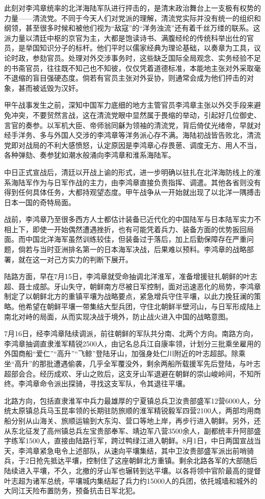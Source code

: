\documentclass[12pt,UTF8]{ctexbook}
\begin{document}
此刻对李鸿章统率的北洋海陆军队进行抨击的，是清末政治舞台上一支极有权势的力量——清流党。不同于今天人们对党派的理解，清流党实际并没有统一的组织和纲领，甚至很多时候和被他们视为“敌寇”的“洋务浊流”还有着千丝万缕的联系。这派力量以清廷中枢的京官为主，大都是饱读诗书、满腹经纶的传统科举出仕的官员，是举国知识分子的标杆。他们平时以儒家经典为理论基础，以奏章为工具，议论时政，参劾官员。处理对外交涉事务时，这些缺乏国际全局观念、实务经验不足的书斋官员，往往既不知己也不知彼，仅仅凭着道德标准，本能地主张对外采取毫不退缩的盲目强硬态度。倘若有官员主张对外妥协，则通常会成为他们抨击的对象，甚而被诋毁为汉奸。

甲午战事发生之前，深知中国军力底细的地方主管官员李鸿章主张以外交手段来避免冲突，不要贸然言战，这在清流党眼中显然属于畏缩的举动，引起好几位御史、言官的奏参。以军机大臣、帝师翁同龢为领袖的清流党，背后倚仗光绪帝，早就对经手洋务、多与外国人交涉的李鸿章等洋务派心存不满。海陆初战皆告败北，清流党即对战局的不利大感愤怒，认定原因是李鸿章心存畏葸、调度无方、用人不当，各种弹劾、奏参犹如潮水般涌向李鸿章和淮系海陆军。

中日正式宣战后，清廷以开战上谕的形式，进一步明确以驻扎在北洋海防线上的淮系海陆军作为与日军作战的主力，由李鸿章直接负责指挥、调遣。其他各省则没有得到任何具体任务，大都持观望态度。甲午战争从一开始就出现了以北洋一隅搏击日本一国的奇特局面。

战前，李鸿章乃至很多西方人士都估计装备已近代化的中国陆军与日本陆军实力不相上下，即使一开始偶然遭遇挫折，也有可能凭着兵力、装备方面的优势扳回局面。而中国北洋海军虽然训练较佳，但装备过于落后，加上后勤保障存在严重问题，倘若与当时亚洲排名第一的日本海军决战，后果难以预料。李鸿章的战略部署，就在这一对己方实力的判断下展开。

陆路方面，早在7月15日，李鸿章就受命抽调北洋淮军，准备增援驻扎朝鲜的叶志超、聂士成部。牙山失守，朝鲜南方尽被日军控制，面对迅速恶化的局势，李鸿章制定了以朝鲜北方的重镇平壤为战略要点，紧急增兵守住平壤，以此力挽狂澜的策略。他希望在朝鲜平壤一带集结大型兵团，守住北朝鲜半壁河山，与日军形成陆上南北对峙的局面，从而实现决战于境外，防止战火进入中国的战略意图。

7月16日，经李鸿章陆续调派，前往朝鲜的军队共分南、北两个方向。南路方向，李鸿章抽调直隶淮军精锐2500人，由记名总兵江自康率领，计划分三批乘坐雇用的外国商船“爱仁”“高升”“飞鲸”登陆牙山，加强身处仁川附近的叶志超部。除乘坐“高升”的那批遭遇偷袭，几乎全军覆没外，剩余两船所载援军先后登陆，与叶志超部会合。经历成欢、牙山之败后，这支牙山军退避在朝鲜的崇山峻岭间，不知所终。李鸿章命令派出探骑，寻找这支军队，令其退往平壤。

北路方向，包括直隶淮军中兵力最雄厚的宁夏镇总兵卫汝贵部盛军12营6000人，分统太原镇总兵马玉昆率领的长期驻防旅顺的淮军精锐毅军四营2100人，两部均用商船分别从山海关、旅顺运输到大东沟、营口等地上岸，再步行进入朝鲜。另外，还从东北征发了高州镇总兵左宝贵部奉军、靖边军八营3500余人，副都统丰升阿部盛字练军1500人，直接由陆路行军，跨过鸭绿江进入朝鲜。8月1日，中日两国宣战当天，李鸿章紧急电令上述部队，从速向平壤集结，其中卫汝贵部盛军派出前哨骑兵，于2日抢先抵达平壤，控制住了这座朝鲜北方重镇。剩余北路各军的大部随后陆续进入平壤，不久，北撤的牙山军也辗转到达平壤。以各将领中官阶最高的提督叶志超为诸军总统，平壤城内集结起了兵力约15000人的兵团，依托城墙和城外的大同江天险布置防务，预备抗击日军北犯。
\end{document}
